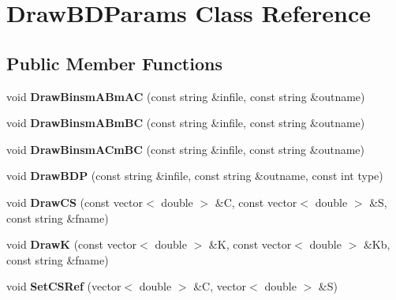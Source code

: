 \hypertarget{class_draw_b_d_params}{}\section{Draw\+B\+D\+Params Class Reference}
\label{class_draw_b_d_params}
\subsection*{Public Member Functions}
\begin{DoxyCompactItemize}
\item 
\hypertarget{class_draw_b_d_params_aa64821ad156334eaed436ab44d324a7c}{}void {\bfseries Draw\+Binsm\+A\+Bm\+A\+C} (const string \&infile, const string \&outname)\label{class_draw_b_d_params_aa64821ad156334eaed436ab44d324a7c}

\item 
\hypertarget{class_draw_b_d_params_a409f74d3903d672635940695bcab2b3f}{}void {\bfseries Draw\+Binsm\+A\+Bm\+B\+C} (const string \&infile, const string \&outname)\label{class_draw_b_d_params_a409f74d3903d672635940695bcab2b3f}

\item 
\hypertarget{class_draw_b_d_params_afe1e6f6c6678f7c9c49f688dc6fe80b2}{}void {\bfseries Draw\+Binsm\+A\+Cm\+B\+C} (const string \&infile, const string \&outname)\label{class_draw_b_d_params_afe1e6f6c6678f7c9c49f688dc6fe80b2}

\item 
\hypertarget{class_draw_b_d_params_a79de195da3d8e093d3a4e55071873d4c}{}void {\bfseries Draw\+B\+D\+P} (const string \&infile, const string \&outname, const int type)\label{class_draw_b_d_params_a79de195da3d8e093d3a4e55071873d4c}

\item 
\hypertarget{class_draw_b_d_params_a383118d23b34f8aa49772330e34d797a}{}void {\bfseries Draw\+C\+S} (const vector$<$ double $>$ \&C, const vector$<$ double $>$ \&S, const string \&fname)\label{class_draw_b_d_params_a383118d23b34f8aa49772330e34d797a}

\item 
\hypertarget{class_draw_b_d_params_a6676a8c08731d97efae27da167445ce0}{}void {\bfseries Draw\+K} (const vector$<$ double $>$ \&K, const vector$<$ double $>$ \&Kb, const string \&fname)\label{class_draw_b_d_params_a6676a8c08731d97efae27da167445ce0}

\item 
\hypertarget{class_draw_b_d_params_a3d4b53efa3f7a3ec92c4508aa4132653}{}void {\bfseries Set\+C\+S\+Ref} (vector$<$ double $>$ \&C, vector$<$ double $>$ \&S)\label{class_draw_b_d_params_a3d4b53efa3f7a3ec92c4508aa4132653}


\end{DoxyCompactItemize}
